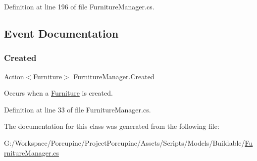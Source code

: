 Definition at line 196 of file Furniture\+Manager.\+cs.



\subsection{Event Documentation}
\mbox{\label{class_furniture_manager_a40726185433919d2017c568af6deef33}} 
\subsubsection{\texorpdfstring{Created}{Created}}
{\footnotesize\ttfamily Action$<$\hyperlink{class_furniture}{Furniture}$>$ Furniture\+Manager.\+Created}



Occurs when a \hyperlink{class_furniture}{Furniture} is created. 



Definition at line 33 of file Furniture\+Manager.\+cs.



The documentation for this class was generated from the following file\+:\begin{DoxyCompactItemize}
\item 
G\+:/\+Workspace/\+Porcupine/\+Project\+Porcupine/\+Assets/\+Scripts/\+Models/\+Buildable/\hyperlink{_furniture_manager_8cs}{Furniture\+Manager.\+cs}\end{DoxyCompactItemize}
